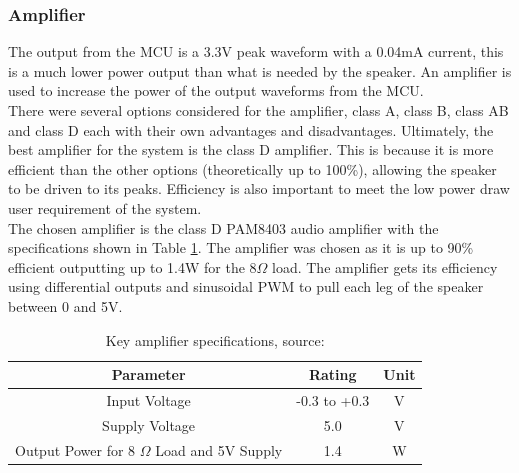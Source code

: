 \subsubsection{Amplifier}
The output from the MCU is a 3.3V peak waveform with a 0.04mA current, this is a much lower power output than what is needed by the speaker. An amplifier is used to increase the power of the output waveforms from the MCU. \\

There were several options considered for the amplifier, class A, class B, class AB and class D each with their own advantages and disadvantages. Ultimately, the best amplifier for the system is the class D amplifier. This is because it is more efficient than the other options (theoretically up to 100\%), allowing the speaker to be driven to its peaks. Efficiency is also important to meet the low power draw user requirement of the system. \\

The chosen amplifier is the class D PAM8403 audio amplifier with the specifications shown in Table \ref{tab:L_ampSpecs}. The amplifier was chosen as it is up to 90\% efficient outputting up to 1.4W for the 8$\Omega$ load. The amplifier gets its efficiency using differential outputs and sinusoidal PWM to pull each leg of the speaker between 0 and 5V.\\
\begin{table} [!htb]
	\caption{Key amplifier specifications, source: \cite{amplifierDatasheet}}
	\label{tab:L_ampSpecs}
	\centering
	\begin{tabular}{ |c|c|c| } 
		\hline
		Parameter & Rating & Unit \\ 
		\hline
		Input Voltage & -0.3 to +0.3 & V \\ 
		Supply Voltage & 5.0 & V \\ 
		Output Power for 8 $\Omega$ Load and 5V Supply & 1.4 & W \\
		\hline
	\end{tabular}
\end{table}


